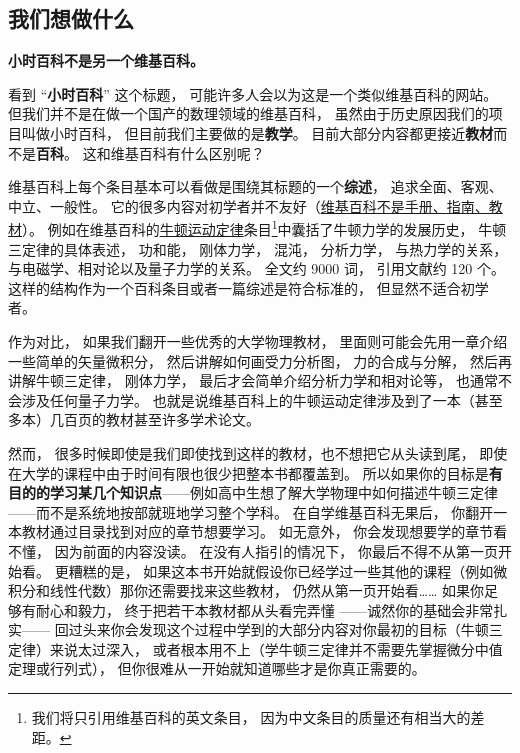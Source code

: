 
\subsection{我们想做什么}
\textbf{小时百科不是另一个维基百科。}

看到 “\textbf{小时百科}” 这个标题， 可能许多人会以为这是一个类似维基百科的网站。 但我们并不是在做一个国产的数理领域的维基百科， 虽然由于历史原因我们的项目叫做小时百科， 但目前我们主要做的是\textbf{教学}。 目前大部分内容都更接近\textbf{教材}而不是\textbf{百科}。 这和维基百科有什么区别呢？

维基百科上每个条目基本可以看做是围绕其标题的一个\textbf{综述}， 追求全面、客观、中立、一般性。 它的很多内容对初学者并不友好（\href{https://en.wikipedia.org/wiki/Wikipedia:What_Wikipedia_is_not}{维基百科不是手册、指南、教材}）。 例如在维基百科的\href{https://en.wikipedia.org/wiki/Newton's_laws_of_motion}{牛顿运动定律}条目\footnote{我们将只引用维基百科的英文条目， 因为中文条目的质量还有相当大的差距。}中囊括了牛顿力学的发展历史， 牛顿三定律的具体表述， 功和能， 刚体力学， 混沌， 分析力学， 与热力学的关系， 与电磁学、相对论以及量子力学的关系。 全文约 9000 词， 引用文献约 120 个。 这样的结构作为一个百科条目或者一篇综述是符合标准的， 但显然不适合初学者。

作为对比， 如果我们翻开一些优秀的大学物理教材， 里面则可能会先用一章介绍一些简单的矢量微积分， 然后讲解如何画受力分析图， 力的合成与分解， 然后再讲解牛顿三定律， 刚体力学， 最后才会简单介绍分析力学和相对论等， 也通常不会涉及任何量子力学。 也就是说维基百科上的牛顿运动定律涉及到了一本（甚至多本）几百页的教材甚至许多学术论文。

然而， 很多时候即使是我们即使找到这样的教材，也不想把它从头读到尾， 即使在大学的课程中由于时间有限也很少把整本书都覆盖到。 所以如果你的目标是\textbf{有目的的学习某几个知识点}——例如高中生想了解大学物理中如何描述牛顿三定律——而不是系统地按部就班地学习整个学科。 在自学维基百科无果后， 你翻开一本教材通过目录找到对应的章节想要学习。 如无意外， 你会发现想要学的章节看不懂， 因为前面的内容没读。 在没有人指引的情况下， 你最后不得不从第一页开始看。 更糟糕的是， 如果这本书开始就假设你已经学过一些其他的课程（例如微积分和线性代数）那你还需要找来这些教材， 仍然从第一页开始看…… 如果你足够有耐心和毅力， 终于把若干本教材都从头看完弄懂 ——诚然你的基础会非常扎实—— 回过头来你会发现这个过程中学到的大部分内容对你最初的目标（牛顿三定律）来说太过深入， 或者根本用不上（学牛顿三定律并不需要先掌握微分中值定理或行列式）， 但你很难从一开始就知道哪些才是你真正需要的。

